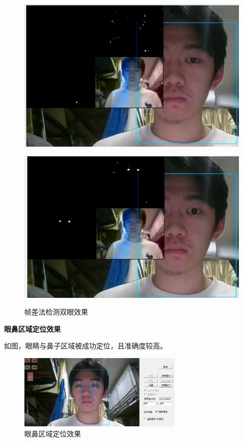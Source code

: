 \documentclass[12pt,hyperref,a4paper,UTF8]{ctexart}
\begin{document}
\begin{figure}[H]
\begin{minipage}{0.3\textwidth}
        \label{fig:frame3}
    \end{minipage}
    \begin{minipage}{0.45\textwidth}
        \centering
        \includegraphics[width=\textwidth]{./figures/fig/frame4.png}
        \label{fig:frame4}
    \end{minipage}
    \begin{minipage}{0.45\textwidth}
        \centering
        \includegraphics[width=\textwidth]{./figures/fig/frame5.png}
        \label{fig:frame5}
    \end{minipage}
    \caption{帧差法检测双眼效果}
    \label{fig:frames}
\end{figure}

        \large \textbf{眼鼻区域定位效果}

        如图，眼睛与鼻子区域被成功定位，且准确度较高。
        \begin{figure}[H]
            \centering
            \includegraphics[width=0.7\textwidth]{./figures/fig/image20.png}
            \caption{眼鼻区域定位效果}
            \label{fig:example}
        \end{figure}
\end{document}

